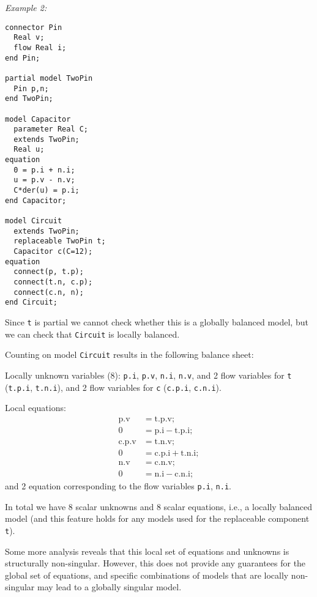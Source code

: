 \begin{example}
\emph{Example 2:}
\begin{lstlisting}[language=modelica]
connector Pin
  Real v;
  flow Real i;
end Pin;

partial model TwoPin
  Pin p,n;
end TwoPin;

model Capacitor
  parameter Real C;
  extends TwoPin;
  Real u;
equation
  0 = p.i + n.i;
  u = p.v - n.v;
  C*der(u) = p.i;
end Capacitor;

model Circuit
  extends TwoPin;
  replaceable TwoPin t;
  Capacitor c(C=12);
equation
  connect(p, t.p);
  connect(t.n, c.p);
  connect(c.n, n);
end Circuit;
\end{lstlisting}

Since \lstinline!t! is partial we cannot check whether this is a globally balanced model, but we can check that \lstinline!Circuit! is locally balanced.

Counting on model \lstinline!Circuit! results in the following balance sheet:

Locally unknown variables (8): \lstinline!p.i!, \lstinline!p.v!, \lstinline!n.i!, \lstinline!n.v!, and 2
flow variables for \lstinline!t! (\lstinline!t.p.i!, \lstinline!t.n.i!), and 2 flow variables for \lstinline!c! (\lstinline!c.p.i!, \lstinline!c.n.i!).

Local equations:
\begin{align*} \text{p.v} &= \text{t.p.v};\\
0 &= \text{p.i}-\text{t.p.i};\\
\text{c.p.v} &= \text{t.n.v};\\
0 &= \text{c.p.i}+\text{t.n.i};\\
\text{n.v} &= \text{c.n.v};\\
0 &= \text{n.i}-\text{c.n.i};
\end{align*}
and 2 equation corresponding to the flow variables \lstinline!p.i!, \lstinline!n.i!.

In total we have 8 scalar unknowns and 8 scalar equations, i.e., a locally balanced model (and this feature holds for any models used for the replaceable component \lstinline!t!).

Some more analysis reveals that this local set of equations and
unknowns is structurally non-singular. However, this does not provide
any guarantees for the global set of equations, and specific
combinations of models that are locally non-singular may lead to a
globally singular model.
\end{example}


